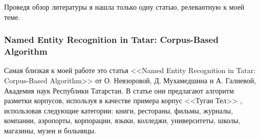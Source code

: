Проведя обзор литературы я нашла только одну статью, релевантную к моей теме.

\subsubsection{Named Entity Recognition in Tatar: Corpus-Based Algorithm}

Самая близкая к моей работе это статья <<Named Entity Recognition in Tatar:
Corpus-Based Algorithm>> от О. Невзоровой, Д. Мухамедшина и А. Галиевой, Академия наук Республики Татарстан. В статье они предлагают алгоритм разметки корпусов, используя в качестве примера корпус <<Туган Тел>> \cite{tugan_tel}, использовав следующие категории: книги, рестораны, фильмы, журналы, компании, аэропорты, корпорации, языки, колледжи, университеты, школы, магазины, музеи и больницы. 

